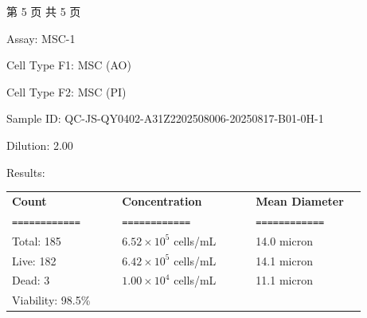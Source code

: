 \documentclass[UTF8,10pt,a4paper,fontset=fandol]{ctexart}
\newcommand{\fieldvalue}[1]{#1}
\begin{document}
\begin{center}
\small 第 5 页 共 5 页
\end{center}

\newpage

\noindent Assay: %
\fieldvalue{MSC-1}

\medskip
\noindent Cell Type F1: %
\fieldvalue{MSC (AO)}

\noindent Cell Type F2: %
\fieldvalue{MSC (PI)}

\medskip
\noindent Sample ID: %
\fieldvalue{QC-JS-QY0402-A31Z2202508006-20250817-B01-0H-1}

\noindent Dilution: %
\fieldvalue{2.00}

\medskip
\noindent\hrulefill

\noindent Results:

\medskip
\begin{tabular}{@{}p{0.28\linewidth}p{0.34\linewidth}p{0.28\linewidth}@{}}
\textbf{Count} & \textbf{Concentration} & \textbf{Mean Diameter} \\
\texttt{============} & \texttt{============} & \texttt{============} \\[2pt]
Total: %
\fieldvalue{185}
&
\fieldvalue{$6.52\times10^{5}$ cells/mL}
&
\fieldvalue{14.0 micron}
\\
Live: %
\fieldvalue{182}
&
\fieldvalue{$6.42\times10^{5}$ cells/mL}
&
\fieldvalue{14.1 micron}
\\
Dead: %
\fieldvalue{3}
&
\fieldvalue{$1.00\times10^{4}$ cells/mL}
&
\fieldvalue{11.1 micron}
\\
Viability: %
\fieldvalue{98.5\%}
&
&
\end{tabular}
\end{document}
